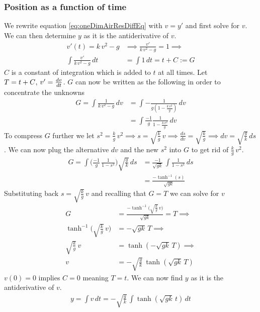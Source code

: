\documentclass[%
aip,
jmp,
amsmath,amssymb,
reprint,%
]{revtex4-1}
\newcommand{\comma}{\hspace{0.1mm},\hspace{0.7mm}}
\begin{document}
	\subsubsection{Position as a function of time}\label{seq:oneDimYt}
	We rewrite equation \eqref{eq:oneDimAirResDiffEq} with $v = y'$ and first solve for $v$. We can then determine $y$ as it is the antiderivative of $v$.
	\begin{align}\nonumber
		v'(t) = k\,v^2 - g &\implies \frac{v'}{k\, v^2 - g} = 1 \implies\\\label{eq:oneDimAirResGSolve}
		\int \frac{v'}{k\, v^2 - g}\,dt &= \int 1 \,dt = t + C := G
	\end{align}
	$C$ is a constant of integration which is added to $t$ at all times. Let $T = t + C \comma v' = \frac{dv}{dt}$. $G$ can now be written as the following in order to concentrate the unknowns
	\begin{align}\nonumber
		G=\int \frac{1}{k\, v^2-g}\,dv &= \int -\frac{1}{g(1-\frac{k\,v^2}{g})}\,dv \\\nonumber
		&= \int \frac{-1}{g} \frac{1}{1-\frac{k\,v^2}{g}}\,dv
	\end{align}
	To compress $G$ further we let $s^2 = \frac{k}{g}\,v^2 \implies s = \sqrt{\frac{k}{g}}\,v \implies \frac{ds}{dv} = \sqrt{\frac{k}{g}} \implies dv = \sqrt{\frac{g}{k}}\,ds$. We can now plug the alternative $dv$ and the new $s^2$ into $G$ to get rid of $\frac{k}{g}\,v^2$.
	\begin{align}\nonumber
		G = \int \Big(\frac{-1}{g} \, \frac{1}{1-s^2}\Big)\sqrt{\frac{g}{k}}\,ds &= \frac{-1}{\sqrt{gk}}\, \int \frac{1}{1-s^2}\,ds\\\nonumber
		&= \frac{-\tanh^{-1}(s)}{\sqrt{gk}}
	\end{align}
	Substituting back $s=\sqrt{\frac{k}{g}}\,v$ and recalling that $G = T$ we can  solve for $v$
	\begin{align}\nonumber
		G &= \frac{-\tanh^{-1}\big(\sqrt{\frac{k}{g}}\,v\big)}{\sqrt{gk}} = T \implies\\\nonumber
		\tanh^{-1}\Big(\sqrt{\frac{k}{g}}\,v\Big) &= -\sqrt{gk}\,T\implies\\\nonumber
		\sqrt{\frac{k}{g}}\,v &= \tanh(-\sqrt{gk}\,T) \implies \\\label{eq:oneDimAirResVT}
		v &= -\sqrt{\frac{g}{k}}\,\tanh(\sqrt{gk}\,T)
	\end{align}
	$v(0) = 0$ implies $C = 0$ meaning $T = t$. We can now find $y$ as it is the antiderivative of $v$.
	\begin{align}\nonumber
		y = \int v\,dt = -\sqrt{\frac{g}{k}}\,\int \tanh(\sqrt{gk}\,t)\,dt
	\end{align}
\end{document}
